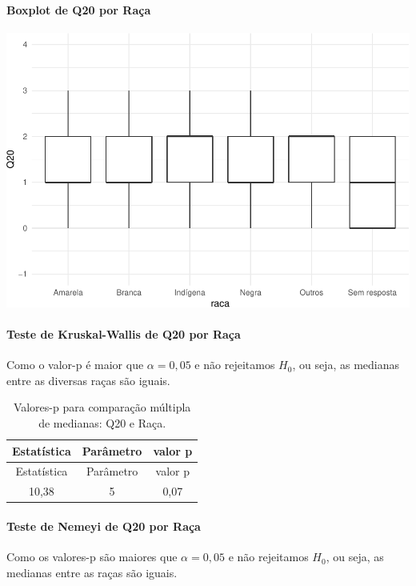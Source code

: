 \documentclass[]{article}
\let\oldparagraph\paragraph
\renewcommand{\paragraph}[1]{\oldparagraph{#1}\mbox{}}
\begin{document}
\hypertarget{boxplot-de-q20-por-rauxe7a}{%
\paragraph{Boxplot de Q20 por Raça}\label{boxplot-de-q20-por-rauxe7a}}

\begin{center}\includegraphics[width=0.75\linewidth]{relatorio_files/figure-latex/unnamed-chunk-313-1} \end{center}

\hypertarget{teste-de-kruskal-wallis-de-q20-por-rauxe7a}{%
\paragraph{Teste de Kruskal-Wallis de Q20 por Raça}\label{teste-de-kruskal-wallis-de-q20-por-rauxe7a}}

Como o valor-p é maior que \(\alpha=0,05\) e não rejeitamos \(H_0\), ou seja, as medianas entre as diversas raças são iguais.

\begin{longtable}[]{@{}ccc@{}}
\caption{\label{tab:unnamed-chunk-314}Valores-p para comparação múltipla de medianas: Q20 e Raça.}\tabularnewline
\toprule
Estatística & Parâmetro & valor p\tabularnewline
\midrule
\endfirsthead
\toprule
Estatística & Parâmetro & valor p\tabularnewline
\midrule
\endhead
10,38 & 5 & 0,07\tabularnewline
\bottomrule
\end{longtable}

\hypertarget{teste-de-nemeyi-de-q20-por-rauxe7a}{%
\paragraph{Teste de Nemeyi de Q20 por Raça}\label{teste-de-nemeyi-de-q20-por-rauxe7a}}

Como os valores-p são maiores que \(\alpha=0,05\) e não rejeitamos \(H_0\), ou seja, as medianas entre as raças são iguais.
\end{document}

